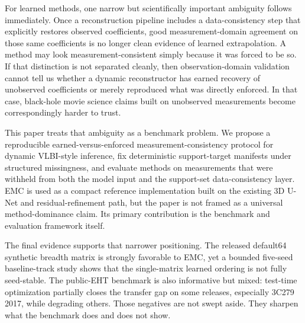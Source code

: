 \documentclass[fleqn,usenatbib]{mnras}
\begin{document}
For learned methods, one narrow but scientifically important ambiguity follows immediately. Once a reconstruction pipeline includes a data-consistency step that explicitly restores observed coefficients, good measurement-domain agreement on those same coefficients is no longer clean evidence of learned extrapolation. A method may look measurement-consistent simply because it was forced to be so. If that distinction is not separated cleanly, then observation-domain validation cannot tell us whether a dynamic reconstructor has earned recovery of unobserved coefficients or merely reproduced what was directly enforced. In that case, black-hole movie science claims built on unobserved measurements become correspondingly harder to trust.

This paper treats that ambiguity as a benchmark problem. We propose a reproducible earned-versus-enforced measurement-consistency protocol for dynamic VLBI-style inference, fix deterministic support-target manifests under structured missingness, and evaluate methods on measurements that were withheld from both the model input and the support-set data-consistency layer. EMC is used as a compact reference implementation built on the existing 3D U-Net and residual-refinement path, but the paper is not framed as a universal method-dominance claim. Its primary contribution is the benchmark and evaluation framework itself.

The final evidence supports that narrower positioning. The released default64 synthetic breadth matrix is strongly favorable to EMC, yet a bounded five-seed baseline-track study shows that the single-matrix learned ordering is not fully seed-stable. The public-EHT benchmark is also informative but mixed: test-time optimization partially closes the transfer gap on some releases, especially 3C279 2017, while degrading others. Those negatives are not swept aside. They sharpen what the benchmark does and does not show.
\end{document}
